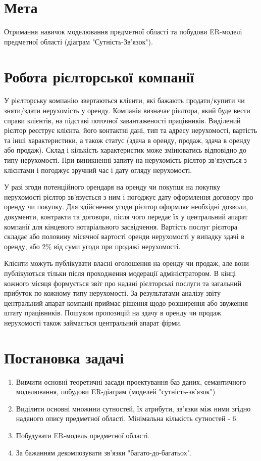 \section{Мета}

Отримання навичок моделювання предметної області та побудови ER-моделі
предметної області (діаграм "Сутність-Зв'язок").

\section{Робота рієлторської компанії}

У рієлторську компанію звертаються клієнти, які бажають продати/купити чи зняти/здати нерухомість
у оренду. Компанія визначає рієлтора, який буде вести справи клієнтів, на підставі поточної
завантаженості працівників. Виділений рієлтор реєструє клієнта, його контактні дані, тип та
адресу нерухомості, вартість та інші характеристики, а також статус (здача в оренду, продаж,
здача в оренду або продаж). Склад і кількість характеристик може змінюватись відповідно до типу
нерухомості. При виникненні запиту на нерухомість рієлтор зв'язується з клієнтами і погоджує
зручний час і дату огляду нерухомості.

У разі згоди потенційного орендаря на оренду чи покупця на покупку нерухомості рієлтор зв'язується
з ним і погоджує дату оформлення договору про оренду чи покупку. Для здійснення угоди рієлтор оформляє
необхідні дозволи, документи, контракти та договори, після чого передає їх у центральний апарат
компанії для кінцевого нотаріального засвідчення. Вартість послуг рієлтора складає або половину
місячної вартості оренди нерухомості у випадку здачі в оренду, або 2\% від суми угоди при продажі нерухомості.

Клієнти можуть публікувати власні оголошення на оренду чи продаж, але вони публікуються тільки після
проходження модерації адміністратором. В кінці кожного місяця формується звіт про надані рієлторські
послуги та загальний прибуток по кожному типу нерухомості. За результатами аналізу звіту центральний
апарат компанії приймає рішення щодо розширення або звуження штату працівників. Пошуком пропозицій
на здачу в оренду чи продаж нерухомості також займається центральний апарат фірми.

\section{Постановка задачі}

\begin{enumerate}
      \item Вивчити основні теоретичні засади проектування баз даних, семантичного моделювання,
            побудови ER-діаграм (моделей "сутність-зв'язок")
      \item Виділити основні множини сутностей, їх атрибути, зв'язки між ними згідно наданого опису
            предметної області. Мінімальна кількість сутностей - 6.
      \item Побудувати ER-модель предметної області.
      \item За бажанням декомпозувати зв'язки "багато-до-багатьох".
\end{enumerate}
